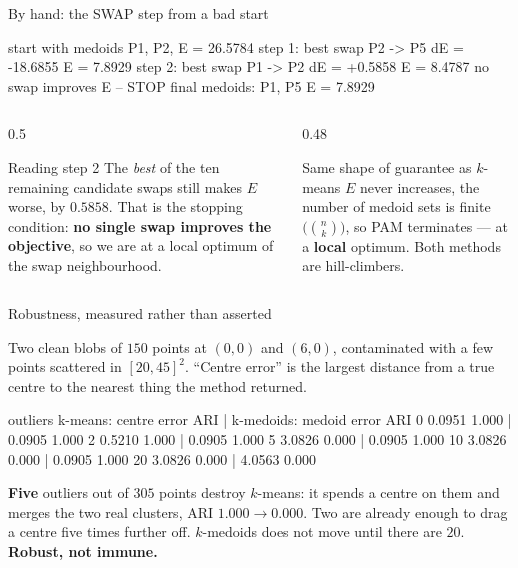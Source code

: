 \documentclass[aspectratio=169]{beamer}
\begin{document}
\begin{frame}[fragile,shrink=6]{By hand: the SWAP step from a bad start}
\begin{outblk}
  start with medoids {P1, P2}, E = 26.5784
  step 1: best swap  P2 -> P5   dE = -18.6855   E =  7.8929
  step 2: best swap  P1 -> P2   dE =  +0.5858   E =  8.4787
          no swap improves E -- STOP
  final medoids: {P1, P5}   E = 7.8929
\end{outblk}
  \vspace{0.3em}
  \begin{columns}[T]
    \begin{column}{0.5\textwidth}
      \begin{block}{Reading step 2}
        \small The \emph{best} of the ten remaining candidate swaps still
        makes $E$ worse, by $0.5858$. That is the stopping condition:
        \textbf{no single swap improves the objective}, so we are at a local
        optimum of the swap neighbourhood.
      \end{block}
    \end{column}
    \begin{column}{0.48\textwidth}
      \begin{alertblock}{Same shape of guarantee as $k$-means}
        \small $E$ never increases, the number of medoid sets is finite
        $\bigl(\binom{n}{k}\bigr)$, so PAM terminates --- at a
        \textbf{local} optimum. Both methods are hill-climbers.
      \end{alertblock}
    \end{column}
  \end{columns}
\end{frame}

\begin{frame}[fragile,shrink=8]{Robustness, measured rather than asserted}
  \begin{center}\small
    Two clean blobs of $150$ points at $(0,0)$ and $(6,0)$, contaminated with
    a few points scattered in $[20,45]^2$. ``Centre error'' is the largest
    distance from a true centre to the nearest thing the method returned.
  \end{center}
\begin{outblk}
  outliers  k-means: centre error  ARI  |  k-medoids: medoid error  ARI
       0              0.0951   1.000  |                0.0905   1.000
       2              0.5210   1.000  |                0.0905   1.000
       5              3.0826   0.000  |                0.0905   1.000
      10              3.0826   0.000  |                0.0905   1.000
      20              3.0826   0.000  |                4.0563   0.000
\end{outblk}
  \vspace{0.2em}
  \begin{alertblock}{}
    \centering
    \textbf{Five} outliers out of $305$ points destroy $k$-means: it spends a
    centre on them and merges the two real clusters, ARI $1.000 \to 0.000$.
    Two are already enough to drag a centre five times further off.
    $k$-medoids does not move until there are $20$. \textbf{Robust, not
    immune.}
  \end{alertblock}
\end{frame}
\end{document}
